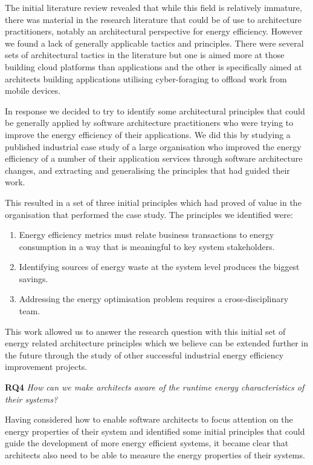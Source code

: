 The initial literature review revealed that while this field is relatively immature, there was material in the research literature that could be of use to architecture practitioners, notably an architectural perspective for energy efficiency.  However we found a lack of generally applicable tactics and principles.  There were several sets of architectural tactics in the literature \cite{lewis2015-foragingtactics,procaccianti2013-cloudenergyefficiency} but one is aimed more at those building cloud platforms than applications and the other is specifically aimed at architects building applications utilising cyber-foraging to offload work from mobile devices.

In response we decided to try to identify some architectural principles that could be generally applied by software architecture practitioners who were trying to improve the energy efficiency of their applications.  We did this by studying a published industrial case study of a large organisation who improved the energy efficiency of a number of their application services through software architecture changes, and extracting and generalising the principles that had guided their work.

This resulted in a set of three initial principles which had proved of value in the organisation that performed the case study.  The principles we identified were:
\begin{enumerate}
	\item Energy efficiency metrics must relate business transactions to energy consumption in a way that is meaningful to key system stakeholders.
	\item Identifying sources of energy waste at the system level produces the biggest savings.
	\item Addressing the energy optimisation problem requires a cross-disciplinary team.
\end{enumerate}

This work allowed us to answer the research question with this initial set of energy related architecture principles which we believe can be extended further in the future through the study of other successful industrial energy efficiency improvement projects.

\textbf{RQ4} \emph{How can we make architects aware of the runtime energy characteristics of their systems?}

Having considered how to enable software architects to focus attention on the energy properties of their system and identified some initial principles that could guide the development of more energy efficient systems, it became clear that architects also need to be able to measure the energy properties of their systems.

